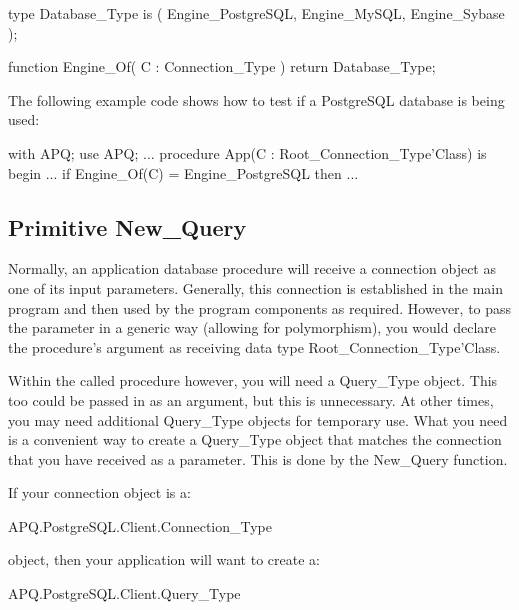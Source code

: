 \documentclass[english,letterpaper]{book}
\begin{document}
\begin{Code}
type Database_Type is (
   Engine_PostgreSQL,
   Engine_MySQL,
   Engine_Sybase
);

function Engine_Of(
   C : Connection_Type
) return Database_Type;
\end{Code}

The following example code shows how to test if a PostgreSQL database
is being used:

\begin{Example}
with APQ; use APQ;
...
procedure App(C : Root_Connection_Type'Class) is
begin
   ...
   if Engine_Of(C) = Engine_PostgreSQL then
      ...
\end{Example}

\subsection{Primitive New\_Query\label{Query_Type Factories}}

Normally, an application database procedure will receive a connection
object as one of its input parameters. Generally, this connection
is established in the main program and then used by the program components
as required. However, to pass the parameter in a generic way (allowing
for polymorphism), you would declare the procedure's argument as receiving
data type Root\_Connection\_Type'Class.

Within the called procedure however, you will need a Query\_Type object.
This too could be passed in as an argument, but this is unnecessary.
At other times, you may need additional Query\_Type objects for temporary
use. What you need is a convenient way to create a Query\_Type object
that matches the connection that you have received as a parameter. This
is done by the New\_Query function.

If your connection object is a:

\begin{Code}

   APQ.PostgreSQL.Client.Connection_Type

\end{Code}

object, then your application will want to create a:

\begin{Code}

   APQ.PostgreSQL.Client.Query_Type

\end{Code}
\end{document}
